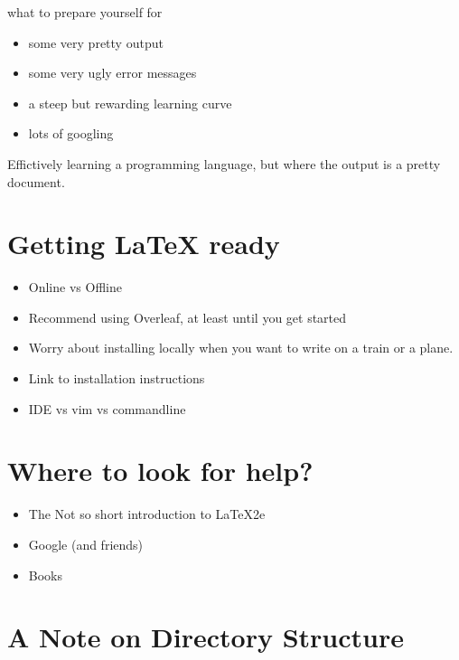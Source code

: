 \documentclass[
]{book}
\providecommand{\tightlist}{%
  \setlength{\itemsep}{0pt}\setlength{\parskip}{0pt}}
\begin{document}
what to prepare yourself for

\begin{itemize}
\tightlist
\item
  some very pretty output
\item
  some very ugly error messages
\item
  a steep but rewarding learning curve
\item
  lots of googling
\end{itemize}

Effictively learning a programming language, but where the output is a pretty document.

\hypertarget{getting-latex-ready}{%
\section{Getting LaTeX ready}\label{getting-latex-ready}}

\begin{itemize}
\tightlist
\item
  Online vs Offline
\item
  Recommend using Overleaf, at least until you get started
\item
  Worry about installing locally when you want to write on a train or a plane.
\item
  Link to installation instructions
\item
  IDE vs vim vs commandline
\end{itemize}

\hypertarget{where-to-look-for-help}{%
\section{Where to look for help?}\label{where-to-look-for-help}}

\begin{itemize}
\tightlist
\item
  The Not so short introduction to LaTeX2e
\item
  Google (and friends)
\item
  Books
\end{itemize}

\hypertarget{a-note-on-directory-structure}{%
\section{A Note on Directory Structure}\label{a-note-on-directory-structure}}
\end{document}
